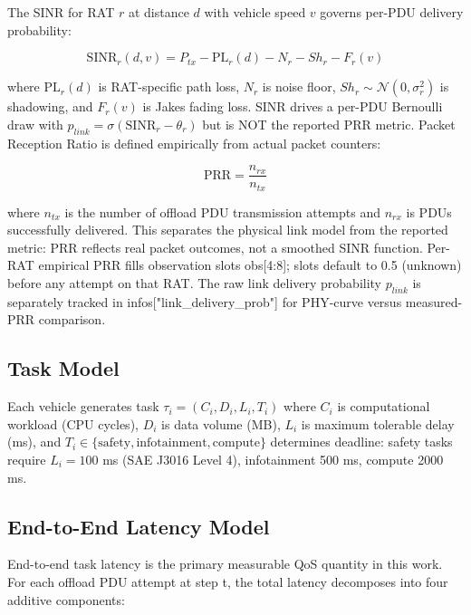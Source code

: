 The SINR for RAT $r$ at distance $d$ with vehicle speed $v$ governs per-PDU delivery probability:

\begin{equation}
\label{eq:sinr}
\text{SINR}_r(d,v) = P_{tx} - \text{PL}_r(d) - N_r - Sh_r - F_r(v)
\end{equation}

where $\text{PL}_r(d)$ is RAT-specific path loss, $N_r$ is noise floor, $Sh_r \sim \mathcal{N}(0,\sigma^2_r)$ is shadowing, and $F_r(v)$ is Jakes fading loss. SINR drives a per-PDU Bernoulli draw with $p_{link} = \sigma(\text{SINR}_r - \theta_r)$ but is NOT the reported PRR metric. Packet Reception Ratio is defined empirically from actual packet counters:

\begin{equation}
\label{eq:prr}
\text{PRR} = \frac{n_{rx}}{n_{tx}}
\end{equation}

where $n_{tx}$ is the number of offload PDU transmission attempts and $n_{rx}$ is PDUs successfully delivered. This separates the physical link model from the reported metric: PRR reflects real packet outcomes, not a smoothed SINR function. Per-RAT empirical PRR fills observation slots obs[4:8]; slots default to 0.5 (unknown) before any attempt on that RAT. The raw link delivery probability $p_{link}$ is separately tracked in infos["link\_delivery\_prob"] for PHY-curve versus measured-PRR comparison.

\subsection{Task Model}

Each vehicle generates task $\tau_i = (C_i, D_i, L_i, T_i)$ where $C_i$ is computational workload (CPU cycles), $D_i$ is data volume (MB), $L_i$ is maximum tolerable delay (ms), and $T_i \in \{\text{safety}, \text{infotainment}, \text{compute}\}$ determines deadline: safety tasks require $L_i = 100$ ms (SAE J3016 Level 4), infotainment 500 ms, compute 2000 ms.

\subsection{End-to-End Latency Model}

End-to-end task latency is the primary measurable QoS quantity in this work. For each offload PDU attempt at step t, the total latency decomposes into four additive components:

